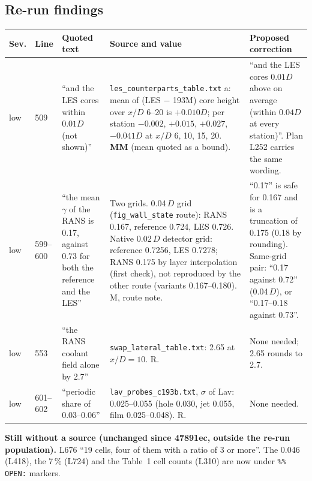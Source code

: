 \documentclass[10pt,a4paper]{article}
\newcommand{\vM}{\textsf{M}}
\newcommand{\vR}{\textsf{R}}
\newcommand{\vMM}{\textbf{\textsf{MM}}}
\begin{document}
\subsection*{Re-run findings}
{\footnotesize
\begin{longtable}{@{}P{9mm} P{9mm} P{42mm} P{55mm} P{44mm}@{}}
\toprule
Sev. & Line & Quoted text & Source and value & Proposed correction \\ \midrule\endhead
low & 509 & ``and the LES cores within $0.01D$ (not shown)''
 & \texttt{les\_counterparts\_table.txt} a: mean of (LES $-$ 193M) core height over $x/D$ 6--20 is $+0.010D$;
   per station $-0.002$, $+0.015$, $+0.027$, $-0.041D$ at $x/D$ 6, 10, 15, 20. \vMM{} (mean quoted as a bound).
 & ``and the LES cores $0.01D$ above on average (within $0.04D$ at every station)''. Plan L252 carries the same
   wording. \\
low & 599--600 & ``the mean $\gamma$ of the RANS is 0.17, against 0.73 for both the reference and the LES''
 & Two grids. 0.04\,$D$ grid (\texttt{fig\_wall\_state} route): RANS 0.167, reference 0.724, LES 0.726. Native
   0.02\,$D$ detector grid: reference 0.7256, LES 0.7278; RANS 0.175 by layer interpolation (first check), not
   reproduced by the other route (variants 0.167--0.180). \vM, route note.
 & ``0.17'' is safe for 0.167 and is a truncation of 0.175 (0.18 by rounding). Same-grid pair: ``0.17 against 0.72''
   (0.04\,$D$), or ``0.17--0.18 against 0.73''. \\
low & 553 & ``the RANS coolant field alone by 2.7''
 & \texttt{swap\_lateral\_table.txt}: 2.65 at $x/D=10$. \vR. & None needed; 2.65 rounds to 2.7. \\
low & 601--602 & ``periodic share of 0.03--0.06''
 & \texttt{lav\_probes\_c193b.txt}, $\sigma$ of Lav: 0.025--0.055 (hole 0.030, jet 0.055, film 0.025--0.048). \vR.
 & None needed. \\
\bottomrule
\end{longtable}}

\textbf{Still without a source (unchanged since 47891ec, outside the re-run population).} L676 ``19 cells, four of them
with a ratio of 3 or more''. The 0.046 (L418), the 7\,\% (L724) and the Table~1 cell counts (L310) are now under
\texttt{\%\% OPEN:} markers.
\end{document}
